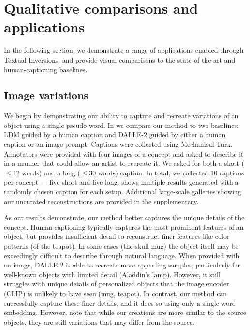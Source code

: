 \section{Qualitative comparisons and applications} 

In the following section, we demonstrate a range of applications enabled through Textual Inversions, and provide visual comparisons to the state-of-the-art and human-captioning baselines. 

\label{sec:applications}



\subsection{Image variations}
\label{sec:image_variations}



We begin by demonstrating our ability to capture and recreate variations of an object using a single pseudo-word. In  we compare our method to two baselines: LDM guided by a human caption and DALLE-2 guided by either a human caption or an image prompt. Captions were collected using Mechanical Turk. Annotators were provided with four images of a concept and asked to describe it in a manner that could allow an artist to recreate it. We asked for both a short ($\leq12$ words) and a long ($\leq30$ words) caption. In total, we collected $10$ captions per concept --- five short and five long.  shows multiple results generated with a randomly chosen caption for each setup. Additional large-scale galleries showing our uncurated reconstructions are provided in the supplementary.

As our results demonstrate, our method better captures the unique details of the concept. Human captioning typically captures the most prominent features of an object, but provides insufficient detail to reconstruct finer features like color patterns (\eg of the teapot). In some cases (\eg the skull mug) the object itself may be exceedingly difficult to describe through natural language. When provided with an image, DALLE-2 is able to recreate more appealing samples, particularly for well-known objects with limited detail (Aladdin's lamp). However, it still struggles with unique details of personalized objects that the image encoder (CLIP) is unlikely to have seen (mug, teapot). In contrast, our method can successfully capture these finer details, and it does so using only a single word embedding. However, note that while our creations are more similar to the source objects, they are still variations that may differ from the source.




